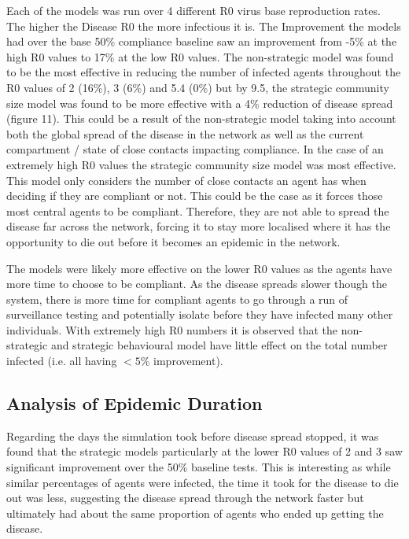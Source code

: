 \documentclass{article}
\begin{document}
Each of the models was run over 4 different R0 virus base reproduction rates. The higher the Disease R0 the more infectious it is. The Improvement the models had over the base 50\% compliance baseline saw an improvement from -5\% at the high R0 values to 17\% at the low R0 values. The non-strategic model was found to be the most effective in reducing the number of infected agents throughout the R0 values of 2 (16\%), 3 (6\%) and 5.4 (0\%) but by 9.5, the strategic community size model was found to be more effective with a 4\% reduction of disease spread (figure 11). This could be a result of the non-strategic model taking into account both the global spread of the disease in the network as well as the current compartment / state of close contacts impacting compliance. In the case of an extremely high R0 values the strategic community size model was most effective.  This model only considers the number of close contacts an agent has when deciding if they are compliant or not. This could be the case as it forces those most central agents to be compliant. Therefore, they are not able to spread the disease far across the network, forcing it to stay more localised where it has the opportunity to die out before it becomes an epidemic in the network.\newline 

The models were likely more effective on the lower R0 values as the agents have more time to choose to be compliant. As the disease spreads slower though the system, there is more time for compliant agents to go through a run of surveillance testing and potentially isolate before they have infected many other individuals. With extremely high R0 numbers it is observed that the non-strategic and strategic behavioural model have little effect on the total number infected (i.e. all having $< 5$\% improvement). 


\subsection{Analysis of Epidemic Duration}

Regarding the days the simulation took before disease spread stopped, it was found that the strategic models particularly at the lower R0 values of 2 and 3 saw significant improvement over the 50\% baseline tests. This is interesting as while similar percentages of agents were infected, the time it took for the disease to die out was less, suggesting the disease spread through the network faster but ultimately had about the same proportion of agents who ended up getting the disease.\newline 
\end{document}
